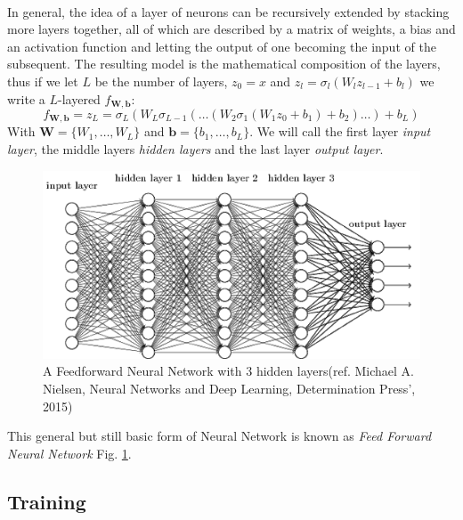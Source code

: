 \documentclass[LaM,binding=0.6cm]{./packages/sapthesis/sapthesis}
\begin{document}
            \paragraph{}
            In general, the idea of a layer of neurons can be recursively extended by stacking more layers together, all of which are described by a matrix of weights, a bias and an activation function
            and letting the output of one becoming the input of the subsequent.
            The resulting model is the mathematical composition of the layers, thus if we let $ L $ be the number of layers, $ z_0 = x $ and $ z_l = \sigma_l\left(W_{l}z_{l-1} + b_l\right)$
            we write a $L$-layered $f_{\mathbf{W}, \mathbf{b}}$:
            \[
                f_{\mathbf{W}, \mathbf{b}} = z_L = \sigma_{L}\left(W_{L}\sigma_{L-1}\left(\ldots\left(W_2\sigma_{1}\left(W_{1}z_{0} +b_1\right)+ b_2\right)\ldots\right)+ b_{L}\right)
            \]
            With $ \mathbf{W} = \{W_1, \ldots, W_{L}\} $ and $ \mathbf{b}= \{b_1, \ldots, b_{L}\} $. We will call the first layer \textit{input layer}, the middle layers \textit{hidden layers}
            and the last layer \textit{output layer}.
            \begin{figure}[h]
                \centering
                \includegraphics[scale=0.5]{fnn}
                \caption{A Feedforward Neural Network with 3 hidden layers(ref. Michael A. Nielsen, Neural Networks and Deep Learning, Determination Press', 2015)}
                \label{fig:fnn}
            \end{figure}
            This general but still basic form of Neural Network is known as \textit{Feed Forward Neural Network} Fig. \ref{fig:fnn}. 
        \subsection{Training}
\end{document}
